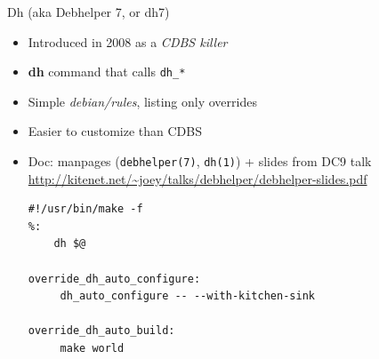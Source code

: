 \documentclass[10pt,final]{beamer}
\begin{document}
\begin{frame}[fragile]{Dh (aka Debhelper 7, or dh7)}
\begin{itemize}
\item Introduced in 2008 as a \textsl{CDBS killer}
\hbr
\item \textbf{dh} command that calls \texttt{dh\_*}
\hbr
\item Simple \textsl{debian/rules}, listing only overrides
\hbr
\item Easier to customize than CDBS
\hbr
\item Doc: manpages (\texttt{debhelper(7)}, \texttt{dh(1)}) + slides from DC9 talk\\
	\url{http://kitenet.net/~joey/talks/debhelper/debhelper-slides.pdf}
	\br
\begin{lstlisting}[basicstyle=\ttfamily\footnotesize]
#!/usr/bin/make -f
%:
    dh $@

override_dh_auto_configure:
     dh_auto_configure -- --with-kitchen-sink

override_dh_auto_build:
     make world

\end{lstlisting}
\end{itemize}
\end{frame}
\end{document}

